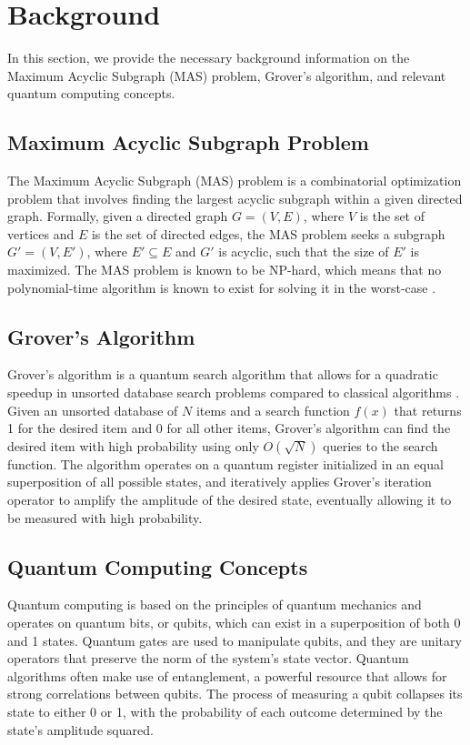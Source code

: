 \section{Background}
\label{sec:background}
In this section, we provide the necessary background information on the Maximum Acyclic Subgraph (MAS) problem, Grover's algorithm, and relevant quantum computing concepts.

\subsection{Maximum Acyclic Subgraph Problem}
The Maximum Acyclic Subgraph (MAS) problem is a combinatorial optimization problem that involves finding the largest acyclic subgraph within a given directed graph. Formally, given a directed graph $G = (V, E)$, where $V$ is the set of vertices and $E$ is the set of directed edges, the MAS problem seeks a subgraph $G' = (V, E')$, where $E' \subseteq E$ and $G'$ is acyclic, such that the size of $E'$ is maximized. The MAS problem is known to be NP-hard, which means that no polynomial-time algorithm is known to exist for solving it in the worst-case \cite{garey1979computers}.

\subsection{Grover's Algorithm}
Grover's algorithm is a quantum search algorithm that allows for a quadratic speedup in unsorted database search problems compared to classical algorithms \cite{grover1996fast}. Given an unsorted database of $N$ items and a search function $f(x)$ that returns 1 for the desired item and 0 for all other items, Grover's algorithm can find the desired item with high probability using only $O(\sqrt{N})$ queries to the search function. The algorithm operates on a quantum register initialized in an equal superposition of all possible states, and iteratively applies Grover's iteration operator to amplify the amplitude of the desired state, eventually allowing it to be measured with high probability.

\subsection{Quantum Computing Concepts}
Quantum computing is based on the principles of quantum mechanics and operates on quantum bits, or qubits, which can exist in a superposition of both 0 and 1 states. Quantum gates are used to manipulate qubits, and they are unitary operators that preserve the norm of the system's state vector. Quantum algorithms often make use of entanglement, a powerful resource that allows for strong correlations between qubits. The process of measuring a qubit collapses its state to either 0 or 1, with the probability of each outcome determined by the state's amplitude squared.

